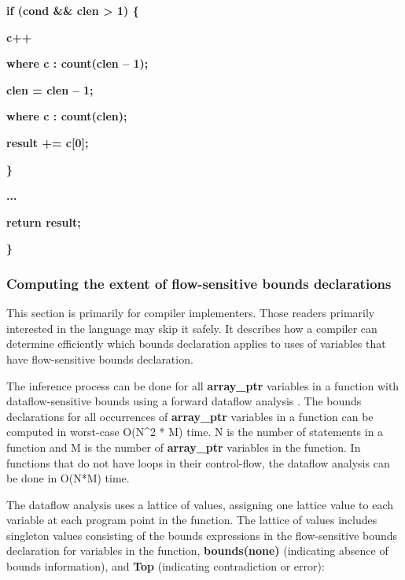 \documentclass[]{article}
\begin{document}
\textbf{if (cond \&\& clen \textgreater{} 1) \{}

\textbf{c++}

\textbf{where c : count(clen -- 1);}

\textbf{clen = clen -- 1;}

\textbf{where c : count(clen);}

\textbf{result += c{[}0{]};}

\textbf{\}}

\textbf{...}

\textbf{return result;}

\textbf{\}}

\subsubsection{\texorpdfstring{\protect\hypertarget{ux5fRef426455622}{}{\protect\hypertarget{ux5fRef426455909}{}{\protect\hypertarget{ux5fToc426641077}{}{\protect\hypertarget{ux5fToc435434942}{}{\protect\hypertarget{ux5fToc437460768}{}{\protect\hypertarget{ux5fToc440445446}{}{\protect\hypertarget{ux5fToc440449228}{}{\protect\hypertarget{ux5fToc440551878}{}{}}}}}}}}Computing
the extent of flow-sensitive bounds
declarations}{Computing the extent of flow-sensitive bounds declarations}}\label{computing-the-extent-of-flow-sensitive-bounds-declarations}

This section is primarily for compiler implementers. Those readers
primarily interested in the language may skip it safely. It describes
how a compiler can determine efficiently which bounds declaration
applies to uses of variables that have flow-sensitive bounds
declaration.

The inference process can be done for all \textbf{array\_ptr} variables
in a function with dataflow-sensitive bounds using a forward dataflow
analysis . The bounds declarations for all occurrences of
\textbf{array\_ptr} variables in a function can be computed in
worst-case O(N\^{}2 * M) time. N is the number of statements in a
function and M is the number of \textbf{array\_ptr} variables in the
function. In functions that do not have loops in their control-flow, the
dataflow analysis can be done in O(N*M) time.

The dataflow analysis uses a lattice of values, assigning one lattice
value to each variable at each program point in the function. The
lattice of values includes singleton values consisting of the bounds
expressions in the flow-sensitive bounds declaration for variables in
the function, \textbf{bounds(none)} (indicating absence of bounds
information), and \textbf{Top} (indicating contradiction or error):
\end{document}
